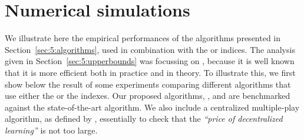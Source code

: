 \section{Numerical simulations}
\label{sec:5:experiments}






We illustrate here the empirical performances of the algorithms presented in Section~\ref{sec:5:algorithms}, used in combination with the \UCB{} or \klUCB{} indices.
The analysis given in Section~\ref{sec:5:upperbounds} was focussing on \klUCB, because it is well known that it is more efficient both in practice and in theory.
To illustrate this, we first show below the result of some experiments comparing different algorithms that use either the \UCB{} or the \klUCB{} indexes.
%
Our proposed algorithms, \MCTopM{}, \RandTopM{} and \Selfish{} are benchmarked against the state-of-the-art \RhoRand{} algorithm.
We also include a centralized multiple-play \klUCB{} algorithm,
as defined by \cite{Anantharam87a},
essentially to check that the \emph{``price of decentralized learning''} is not too large.

